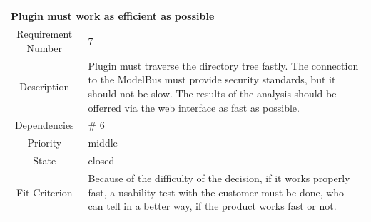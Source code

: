 \begin{longtable}{|c|p{10cm}|}
\hline 
\multicolumn{2}{|l|}{\textbf{Plugin must work as efficient as possible}} \\ 
\hline 
Requirement Number & 7 \\ \hline 
Description & Plugin must traverse the directory tree fastly. The connection to the ModelBus must provide security standards, but it should not be slow. The results of the analysis should be offerred via the web interface as fast as possible. \\ \hline 
Dependencies & \# 6 \\ \hline 
Priority & middle \\ \hline 
State & closed \\ \hline 
Fit Criterion & Because of the difficulty of the decision, if it works properly fast, a usability test with the customer must be done, who can tell in a better way, if the product works fast or not. \\ \hline
\end{longtable}


